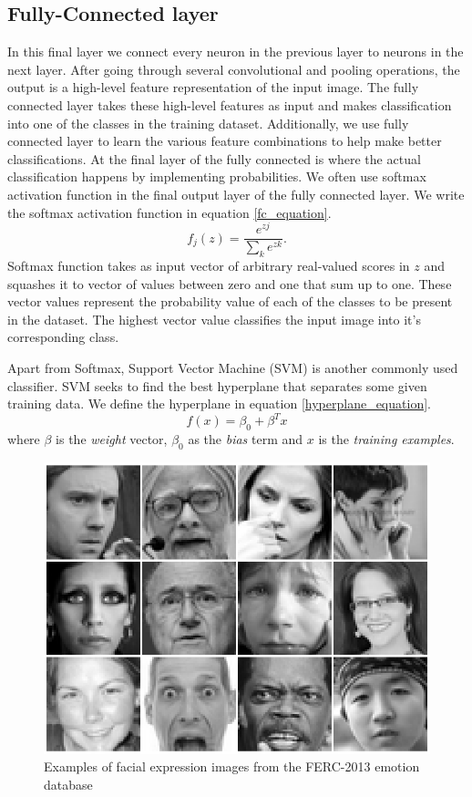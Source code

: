 \documentclass[master]{thesis-uestc}
\begin{document}
\subsection{Fully-Connected layer}
In this final layer we connect every neuron in the previous layer to neurons in the next layer. After going through several convolutional and pooling operations, the output is a high-level feature representation of the input image. The fully connected layer takes these high-level features as input and makes classification into one of the classes in the training dataset. Additionally, we use fully connected layer to learn the various feature combinations to help make better classifications. At the final layer of the fully connected is where the actual classification happens by implementing probabilities. We often use softmax activation function in the final output layer of the fully connected layer. We write the softmax activation function in equation \ref{fc_equation}.
\begin{equation}
    f_j(z) = \frac{e^{zj}}{\sum_{k}^{}e^{zk}}.
\label{fc_equation}
\end{equation}
Softmax function takes as input vector of arbitrary real-valued scores in $z$ and squashes it to vector of values between zero and one that sum up to one. These vector values represent the probability value of each of the classes to be present in the dataset. The highest vector value classifies the input image into it's corresponding class.

Apart from Softmax, Support Vector Machine (SVM) is another commonly used classifier. SVM seeks to find the best hyperplane that separates some given training data. We define the hyperplane in equation \ref{hyperplane_equation}.
\begin{equation}
    f(x) = \beta_{0} + \beta^{T} x
\label{hyperplane_equation}
\end{equation}
where $\beta$ is the \textit{weight} vector, $\beta_{0}$ as the \textit{bias} term and $x$ is the \textit{training examples}.

\begin{figure}[ht]
\includegraphics[width=5in]{pic/fer2013.png}
\caption{Examples of facial expression images from the FERC-2013 emotion database}
\label{fer2013_images}
\end{figure}
\end{document}
